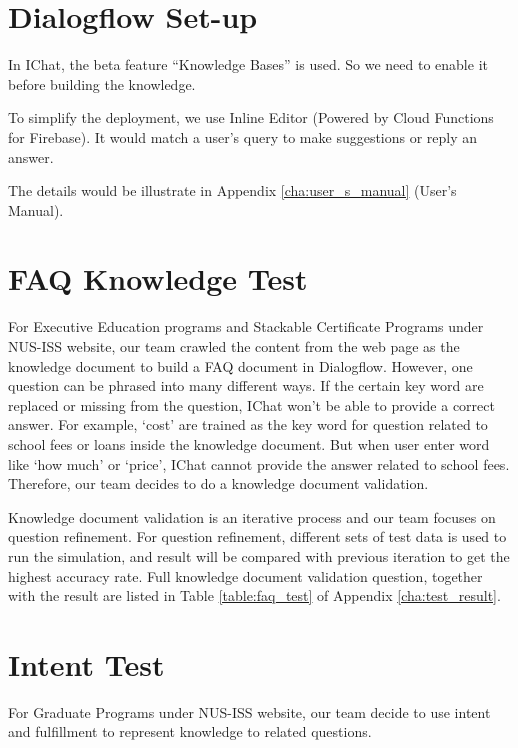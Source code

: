 \section{Dialogflow Set-up} %
\label{sec:dialogflow_setup}
	In IChat, the beta feature ``Knowledge Bases'' is used. So we need to enable it before building the knowledge.

	To simplify the deployment, we use Inline Editor \cite{webhook} (Powered by Cloud Functions for Firebase). It would match a user's query to make suggestions or reply an answer.

	The details would be illustrate in Appendix \ref{cha:user_s_manual} (User's Manual).

\section{FAQ Knowledge Test} %
\label{sec:faq_knowledge_test}
	For Executive Education programs and Stackable Certificate Programs under NUS-ISS website, our team crawled the content from the web page as the knowledge document to build a FAQ document in Dialogflow. However, one question can be phrased into many different ways. If the certain key word are replaced or missing from the question, IChat won’t be able to provide a correct answer. For example, ‘cost’ are trained as the key word for question related to school fees or loans inside the knowledge document. But when user enter word like ‘how much’ or ‘price’, IChat cannot provide the answer related to school fees. Therefore, our team decides to do a knowledge document validation.

	Knowledge document validation is an iterative process and our team focuses on question refinement. For question refinement, different sets of test data is used to run the simulation, and result will be compared with previous iteration to get the highest accuracy rate. Full knowledge document validation question, together with the result are listed in Table \ref{table:faq_test} of Appendix \ref{cha:test_result}.


\section{Intent Test} %
\label{sec:intent_test}
	For Graduate Programs under NUS-ISS website, our team decide to use intent and fulfillment to represent knowledge to related questions.

